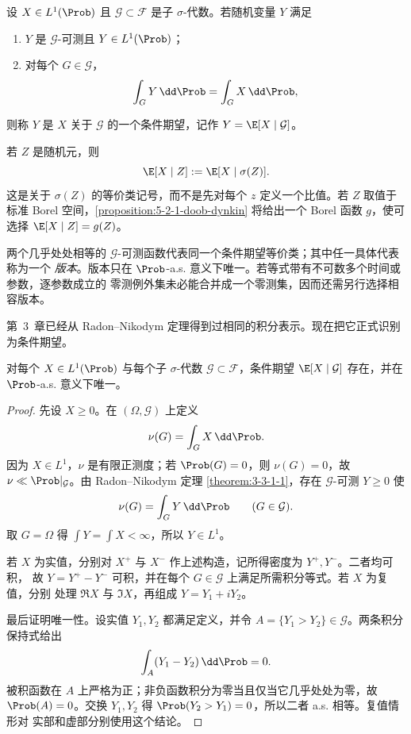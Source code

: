 \begin{definition}[条件期望]\label{def:5-2-1-1}
设 $X\in L^1(\Prob)$ 且 $\mathcal G\subset\mathcal F$ 是子 $\sigma$-代数。若随机变量
$Y$ 满足
\begin{enumerate}
  \item $Y$ 是 $\mathcal G$-可测且 $Y\in L^1(\Prob)$；
  \item 对每个 $G\in\mathcal G$，
  \[
    \int_GY\,\dd\Prob=\int_GX\,\dd\Prob,
  \]
\end{enumerate}
则称 $Y$ 是 $X$ 关于 $\mathcal G$ 的一个条件期望，记作
$Y=\E[X\mid\mathcal G]$。
\end{definition}

\begin{definition}[关于随机变量的条件期望]\label{def:5-2-1-2}
若 $Z$ 是随机元，则
\[
 \E[X\mid Z]:=\E[X\mid\sigma(Z)].
\]
这是关于 $\sigma(Z)$ 的等价类记号，而不是先对每个 $z$ 定义一个比值。若 $Z$ 取值于标准
Borel 空间，\cref{proposition:5-2-1-doob-dynkin} 将给出一个 Borel 函数 $g$，使可选择
$\E[X\mid Z]=g(Z)$。
\end{definition}

\begin{definition}[版本]\label{def:5-2-1-3}
两个几乎处处相等的 $\mathcal G$-可测函数代表同一个条件期望等价类；其中任一具体代表称为一个
\emph{版本}。版本只在 $\Prob$-a.s. 意义下唯一。若等式带有不可数多个时间或参数，逐参数成立的
零测例外集未必能合并成一个零测集，因而还需另行选择相容版本。
\end{definition}

第~3~章已经从 Radon--Nikodym 定理得到过相同的积分表示。现在把它正式识别为条件期望。

\begin{theorem}[条件期望的存在唯一性]\label{theorem:5-2-1-1}
对每个 $X\in L^1(\Prob)$ 与每个子 $\sigma$-代数
$\mathcal G\subset\mathcal F$，条件期望 $\E[X\mid\mathcal G]$ 存在，并在
$\Prob$-a.s. 意义下唯一。
\end{theorem}

\begin{proof}
先设 $X\geq0$。在 $(\Omega,\mathcal G)$ 上定义
\[
 \nu(G)=\int_GX\,\dd\Prob.
\]
因为 $X\in L^1$，$\nu$ 是有限正测度；若 $\Prob(G)=0$，则 $\nu(G)=0$，故
$\nu\ll\Prob|_{\mathcal G}$。由 Radon--Nikodym 定理
\ref{theorem:3-3-1-1}，存在 $\mathcal G$-可测 $Y\geq0$ 使
\[
 \nu(G)=\int_GY\,\dd\Prob\qquad(G\in\mathcal G).
\]
取 $G=\Omega$ 得 $\int Y=\int X<\infty$，所以 $Y\in L^1$。

若 $X$ 为实值，分别对 $X^+$ 与 $X^-$ 作上述构造，记所得密度为 $Y^+,Y^-$。二者均可积，
故 $Y=Y^+-Y^-$ 可积，并在每个 $G\in\mathcal G$ 上满足所需积分等式。若 $X$ 为复值，分别
处理 $\Re X$ 与 $\Im X$，再组成 $Y=Y_1+iY_2$。

最后证明唯一性。设实值 $Y_1,Y_2$ 都满足定义，并令
$A=\{Y_1>Y_2\}\in\mathcal G$。两条积分保持式给出
\[
 \int_A(Y_1-Y_2)\,\dd\Prob=0.
\]
被积函数在 $A$ 上严格为正；非负函数积分为零当且仅当它几乎处处为零，故
$\Prob(A)=0$。交换 $Y_1,Y_2$ 得 $\Prob(Y_2>Y_1)=0$，所以二者 a.s. 相等。复值情形对
实部和虚部分别使用这个结论。
\end{proof}

